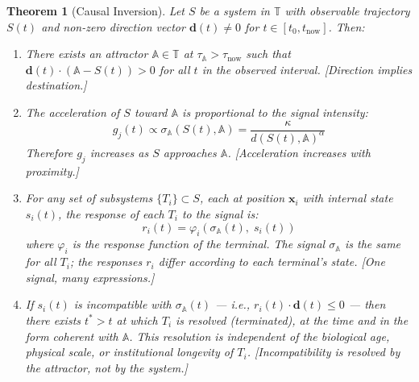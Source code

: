 \documentclass[12pt,a4paper]{article}
\newtheorem{theorem}{Theorem}[section]
\newcommand{\attr}{\mathbb{A}}
\newcommand{\tspc}{\mathbb{T}}
\newcommand{\gj}{g_j}
\begin{document}
\begin{theorem}[Causal Inversion]\label{thm:inversion}
Let $S$ be a system in $\tspc$ with observable trajectory $S(t)$ and non-zero direction vector $\mathbf{d}(t) \neq 0$ for $t \in [t_0, t_{\mathrm{now}}]$. Then:

\begin{enumerate}[label=(\roman*)]
    \item There exists an attractor $\attr \in \tspc$ at $\tau_\attr > \tau_{\mathrm{now}}$ such that $\mathbf{d}(t) \cdot (\attr - S(t)) > 0$ for all $t$ in the observed interval. [\emph{Direction implies destination.}]
    \item The acceleration of $S$ toward $\attr$ is proportional to the signal intensity:
    \begin{equation}
    \gj(t) \propto \sigma_{\mathbb{A}}(S(t), \attr) = \frac{\kappa}{d(S(t), \attr)^\alpha}
    \end{equation}
    Therefore $\gj$ increases as $S$ approaches $\attr$. [\emph{Acceleration increases with proximity.}]
    \item For any set of subsystems $\{T_i\} \subset S$, each at position $\mathbf{x}_i$ with internal state $s_i(t)$, the response of each $T_i$ to the signal is:
    \begin{equation}\label{eq:response}
    r_i(t) = \varphi_i(\sigma_{\mathbb{A}}(t),\; s_i(t))
    \end{equation}
    where $\varphi_i$ is the response function of the terminal. The signal $\sigma_{\mathbb{A}}$ is the same for all $T_i$; the responses $r_i$ differ according to each terminal's state. [\emph{One signal, many expressions.}]
    \item If $s_i(t)$ is incompatible with $\sigma_{\mathbb{A}}(t)$ --- i.e., $r_i(t) \cdot \mathbf{d}(t) \leq 0$ --- then there exists $t^* > t$ at which $T_i$ is resolved (terminated), at the time and in the form coherent with $\attr$. This resolution is independent of the biological age, physical scale, or institutional longevity of $T_i$. [\emph{Incompatibility is resolved by the attractor, not by the system.}]
\end{enumerate}
\end{theorem}
\end{document}
